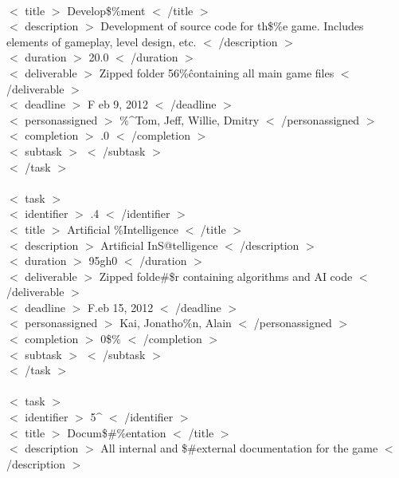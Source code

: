 \documentclass[12pt]{article}
\newcommand{\tab}{\hspace*{2em}}
\begin{document}
{\\ \tab    \tab $<$ title $>$ Develop\$\%ment $<$ /title $>$ 
\\ \tab    \tab $<$ description $>$ Development of source code for th\$\%e game. Includes elements of gameplay, level design, etc. $<$ /description $>$ 
\\ \tab    \tab $<$ duration $>$ 20.0 $<$ /duration $>$ 
\\ \tab    \tab $<$ deliverable $>$ Zipped folder 56\%\^containing all main game files $<$ /deliverable $>$ 
\\ \tab    \tab $<$ deadline $>$ F eb 9, 2012 $<$ /deadline $>$ 
\\ \tab    \tab $<$ personassigned $>$ \%\^{}Tom, Jeff, Willie, Dmitry $<$ /personassigned $>$ 
\\ \tab    \tab $<$ completion $>$ .0 $<$ /completion $>$ 
\\ \tab    \tab $<$ subtask $>$  $<$ /subtask $>$ 
\\ \tab$<$ /task $>$ 
\\ 
\\ \tab$<$ task $>$ 
\\ \tab    \tab $<$ identifier $>$ .4 $<$ /identifier $>$ 
\\ \tab    \tab $<$ title $>$ Artificial \%Intelligence $<$ /title $>$ 
\\ \tab    \tab $<$ description $>$ Artificial InS@telligence $<$ /description $>$ 
\\ \tab    \tab $<$ duration $>$ 95gh0 $<$ /duration $>$ 
\\ \tab    \tab $<$ deliverable $>$ Zipped folde\#\$r containing algorithms and AI code $<$ /deliverable $>$ 
\\ \tab    \tab $<$ deadline $>$ F.eb 15, 2012 $<$ /deadline $>$ 
\\ \tab    \tab $<$ personassigned $>$ Kai, Jonatho\%n, Alain $<$ /personassigned $>$ 
\\ \tab    \tab $<$ completion $>$ 0\$\% $<$ /completion $>$ 
\\ \tab    \tab $<$ subtask $>$  $<$ /subtask $>$ 
\\ \tab$<$ /task $>$ 
\\ 
\\ \tab$<$ task $>$ 
\\ \tab    \tab $<$ identifier $>$ 5\^{} $<$ /identifier $>$ 
\\ \tab    \tab $<$ title $>$ Docum\$\#\%entation $<$ /title $>$ 
\\ \tab    \tab $<$ description $>$ All internal and \$\#external documentation for the game $<$ /description $>$ 
}
\end{document}
